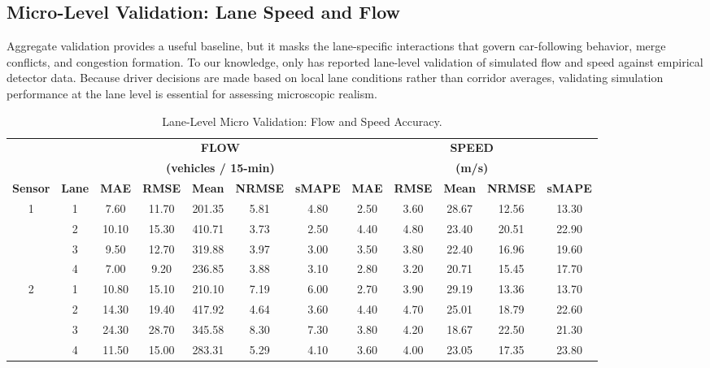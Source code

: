 \documentclass{scspaperproc}
\theoremstyle{scsthe}
\begin{document}
 \subsection{Micro-Level Validation: Lane Speed and Flow}
Aggregate validation provides a useful baseline, but it masks the lane-specific interactions that govern car-following behavior, merge conflicts, and congestion formation. To our knowledge, only \cite{11118854} has reported lane-level validation of simulated flow and speed against empirical detector data. Because driver decisions are made based on local lane conditions rather than corridor averages, validating simulation performance at the lane level is essential for assessing microscopic realism.
\begin{table}[htbp]
    \centering
    \caption{Lane-Level Micro Validation: Flow and Speed Accuracy.}
    \label{tab:micro-flow-speed}
    \scriptsize
    \setlength{\tabcolsep}{6pt}
    \begin{tabular}{cc|ccccc|ccccc}
        \hline
         & & \multicolumn{5}{c|}{\textbf{\large FLOW}}
             & \multicolumn{5}{c}{\textbf{\large SPEED}} \\
         & & \multicolumn{5}{c|}{\textbf{(vehicles / 15-min)}}
             & \multicolumn{5}{c}{\textbf{(m/s)}} \\
        \cline{3-12}
        \textbf{Sensor} & \textbf{Lane}
         & \textbf{MAE} & \textbf{RMSE} & \textbf{Mean} & \textbf{NRMSE} & \textbf{sMAPE}
         & \textbf{MAE} & \textbf{RMSE} & \textbf{Mean} & \textbf{NRMSE} & \textbf{sMAPE} \\
        \hline
        1 & 1 & 7.60 & 11.70 & 201.35 & 5.81 & 4.80 & 2.50 & 3.60 & 28.67 & 12.56 & 13.30 \\
          & 2 & 10.10 & 15.30 & 410.71 & 3.73 & 2.50 & 4.40 & 4.80 & 23.40 & 20.51 & 22.90 \\
          & 3 & 9.50 & 12.70 & 319.88 & 3.97 & 3.00 & 3.50 & 3.80 & 22.40 & 16.96 & 19.60 \\
          & 4 & 7.00 & 9.20 & 236.85 & 3.88 & 3.10 & 2.80 & 3.20 & 20.71 & 15.45 & 17.70 \\
        \hline
        2 & 1 & 10.80 & 15.10 & 210.10 & 7.19 & 6.00 & 2.70 & 3.90 & 29.19 & 13.36 & 13.70 \\
          & 2 & 14.30 & 19.40 & 417.92 & 4.64 & 3.60 & 4.40 & 4.70 & 25.01 & 18.79 & 22.60 \\
          & 3 & 24.30 & 28.70 & 345.58 & 8.30 & 7.30 & 3.80 & 4.20 & 18.67 & 22.50 & 21.30 \\
          & 4 & 11.50 & 15.00 & 283.31 & 5.29 & 4.10 & 3.60 & 4.00 & 23.05 & 17.35 & 23.80 \\

\end{tabular}
\end{table}
\end{document}
